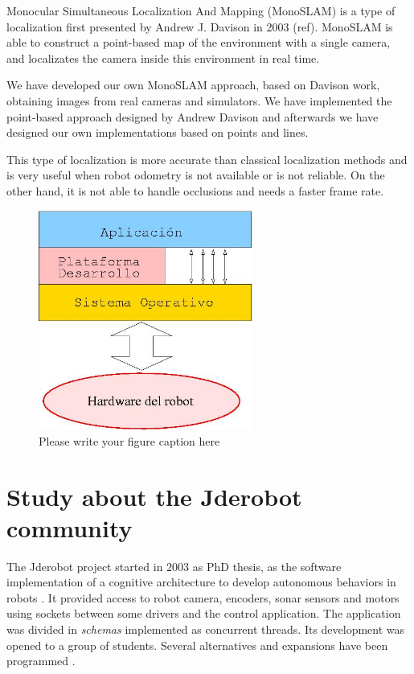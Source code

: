 \documentclass[twocolumn]{svjour3}          %
\begin{document}
Monocular Simultaneous Localization And Mapping (MonoSLAM) is a type of localization first presented by Andrew J. Davison in 2003 (ref). MonoSLAM is able to construct a point-based map of the environment with a single camera, and localizates the camera inside this environment in real time.

We have developed our own MonoSLAM approach, based on Davison work, obtaining images from real cameras and simulators. We have implemented the point-based approach designed by Andrew Davison and afterwards we have designed our own implementations based on points and lines.

This type of localization is more accurate than classical localization methods and is very useful when robot odometry is not available or is not reliable. On the other hand, it is not able to handle occlusions and needs a faster frame rate.

\begin{figure}
  \includegraphics[width=7cm]{figs/programacion3.jpg}
\caption{Please write your figure caption here}
\label{fig:2}       %
\end{figure}

\section{Study about the Jderobot community}

The Jderobot project started in 2003 as PhD thesis, as the software implementation of a cognitive architecture to develop autonomous behaviors in robots \cite{canas02,canas05e}. It provided access to robot camera, encoders, sonar sensors and motors using sockets between some drivers and the control application. The application was divided in \textit{schemas} implemented as concurrent threads. Its development was opened to a group of students. Several alternatives and expansions have been programmed \cite{canas07,canas07f}.
\end{document}
